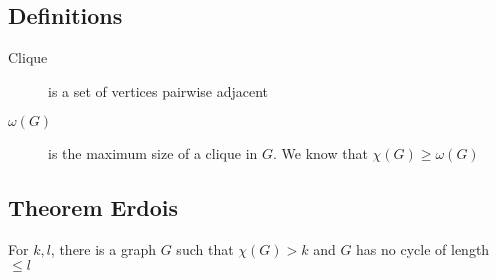         \subsection{Definitions}
            \begin{description}
                \item[Clique] is a set of vertices pairwise adjacent
                \item[$\omega(G)$] is the maximum size of a clique in $G$. We know that $\chi(G)\geq\omega(G)$
            \end{description}
        \subsection{Theorem Erdois}
            For $k, l$, there is a graph $G$ such that $\chi(G)>k$ and $G$ has no cycle of length $\leq l$

